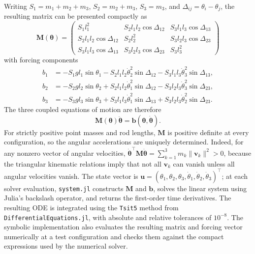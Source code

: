 Writing $S_1=m_1+m_2+m_3$, $S_2=m_2+m_3$, $S_3=m_3$, and
$\Delta_{ij}=\theta_i-\theta_j$, the resulting matrix can be presented
compactly as
\begin{equation}
    \boxed{
    \mathbf M(\boldsymbol\theta)=
    \begin{pmatrix}
        S_1l_1^2 & S_2l_1l_2\cos\Delta_{12}
                    & S_3l_1l_3\cos\Delta_{13}\\
        S_2l_1l_2\cos\Delta_{12} & S_2l_2^2
                    & S_3l_2l_3\cos\Delta_{23}\\
        S_3l_1l_3\cos\Delta_{13} & S_3l_2l_3\cos\Delta_{23}
                    & S_3l_3^2
    \end{pmatrix}
    }
    \label{eq:triple_ne_mass_matrix}
\end{equation}
with forcing components
\begin{align}
    b_1 &= -S_1gl_1\sin\theta_1
           -S_2l_1l_2\dot\theta_2^2\sin\Delta_{12}
           -S_3l_1l_3\dot\theta_3^2\sin\Delta_{13}, \\
    b_2 &= -S_2gl_2\sin\theta_2
           +S_2l_1l_2\dot\theta_1^2\sin\Delta_{12}
           -S_3l_2l_3\dot\theta_3^2\sin\Delta_{23}, \\
    b_3 &= -S_3gl_3\sin\theta_3
           +S_3l_1l_3\dot\theta_1^2\sin\Delta_{13}
           +S_3l_2l_3\dot\theta_2^2\sin\Delta_{23}.
    \label{eq:triple_ne_forcing}
\end{align}
The three coupled equations of motion are therefore
\begin{equation}
    \boxed{\mathbf M(\boldsymbol\theta)\ddot{\boldsymbol\theta}
           =\mathbf b(\boldsymbol\theta,\dot{\boldsymbol\theta}).}
    \label{eq:triple_ne_final}
\end{equation}
For strictly positive point masses and rod lengths, $\mathbf M$ is positive
definite at every configuration, so the angular accelerations are uniquely
determined. Indeed, for any nonzero vector of angular velocities,
$\dot{\boldsymbol\theta}^{\top}\mathbf M\dot{\boldsymbol\theta}
=\sum_{k=1}^{3}m_k\|\mathbf v_k\|^2>0$, because the triangular
kinematic relations imply that not all $\mathbf v_k$ can vanish unless
all angular velocities vanish. The state vector is
$\mathbf u=(\theta_1,\theta_2,\theta_3,
\dot\theta_1,\dot\theta_2,\dot\theta_3)^\top$; at each solver evaluation,
\texttt{system.jl} constructs $\mathbf M$ and $\mathbf b$, solves the linear
system using Julia's backslash operator, and returns the first-order time
derivatives. The resulting ODE is integrated using the \texttt{Tsit5} method
from \texttt{DifferentialEquations.jl}, with absolute and relative tolerances
of $10^{-8}$. The symbolic implementation also evaluates the resulting
matrix and forcing vector numerically at a test configuration and checks them
against the compact expressions used by the numerical solver.

